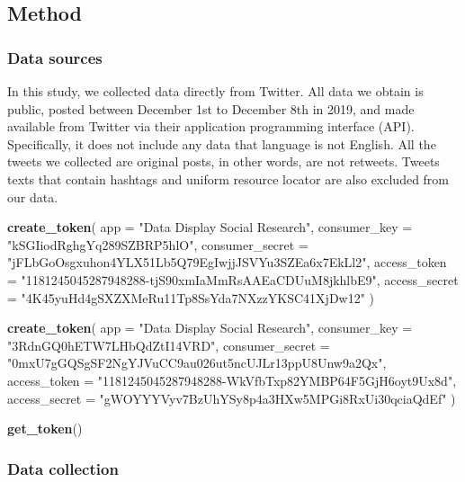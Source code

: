 \documentclass[]{article}
\newenvironment{Shaded}{\begin{snugshade}}{\end{snugshade}}
\newcommand{\DataTypeTok}[1]{\textcolor[rgb]{0.13,0.29,0.53}{#1}}
\newcommand{\KeywordTok}[1]{\textcolor[rgb]{0.13,0.29,0.53}{\textbf{#1}}}
\newcommand{\NormalTok}[1]{#1}
\newcommand{\StringTok}[1]{\textcolor[rgb]{0.31,0.60,0.02}{#1}}
\begin{document}
\hypertarget{method}{%
\subsection{Method}\label{method}}

\hypertarget{data-sources}{%
\subsubsection{Data sources}\label{data-sources}}

In this study, we collected data directly from Twitter. All data we
obtain is public, posted between December 1st to December 8th in 2019,
and made available from Twitter via their application programming
interface (API). Specifically, it does not include any data that
language is not English. All the tweets we collected are original posts,
in other words, are not retweets. Tweets texts that contain hashtags and
uniform resource locator are also excluded from our data.

\begin{Shaded}
\begin{Highlighting}[]
\KeywordTok{create_token}\NormalTok{(}
  \DataTypeTok{app =} \StringTok{"Data Display Social Research"}\NormalTok{,}
  \DataTypeTok{consumer_key =} \StringTok{"kSGIiodRghgYq289SZBRP5hlO"}\NormalTok{,}
  \DataTypeTok{consumer_secret =} \StringTok{"jFLbGoOsgxuhon4YLX51Lb5Q79EgIwjjJSVYu3SZEa6x7EkLl2"}\NormalTok{,}
  \DataTypeTok{access_token =} \StringTok{"1181245045287948288-tjS90xmIaMmRsAAEaCDUuM8jkhlbE9"}\NormalTok{,}
  \DataTypeTok{access_secret =} \StringTok{"4K45yuHd4gSXZXMeRu11Tp8SsYda7NXzzYKSC41XjDw12"}
\NormalTok{)}

\KeywordTok{create_token}\NormalTok{(}
  \DataTypeTok{app =} \StringTok{"Data Display Social Research"}\NormalTok{,}
  \DataTypeTok{consumer_key =} \StringTok{"3RdnGQ0hETW7LHbQdZtI14VRD"}\NormalTok{,}
  \DataTypeTok{consumer_secret =} \StringTok{"0mxU7gGQSgSF2NgYJVuCC9au026ut5ncUJLr13ppU8Unw9a2Qx"}\NormalTok{,}
  \DataTypeTok{access_token =} \StringTok{"1181245045287948288-WkVfbTxp82YMBP64F5GjH6oyt9Ux8d"}\NormalTok{,}
  \DataTypeTok{access_secret =} \StringTok{"gWOYYYVyv7BzUhYSy8p4a3HXw5MPGi8RxUi30qciaQdEf"}
\NormalTok{)}

\KeywordTok{get_token}\NormalTok{()}
\end{Highlighting}
\end{Shaded}

\hypertarget{data-collection}{%
\subsubsection{Data collection}\label{data-collection}}
\end{document}
